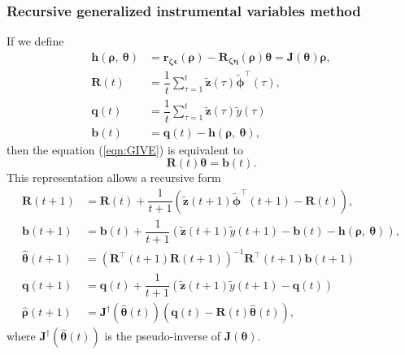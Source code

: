 \subsubsection{Recursive generalized instrumental variables method}
If we define
\begin{equation} \begin{aligned} \mathbf{h} \left( \bm{\rho}, \ \bm{\theta} \right)  &=  \mathbf{r}_{\bm{\zeta} \bm{\epsilon}} \left( \bm{\rho} \right) - \mathbf{R}_{\bm{\zeta} \bm{\eta}} \left( \bm{\rho} \right) \bm{\theta}  =  \mathbf{J} \left( \bm{\theta} \right) \bm{\rho}, \\
\mathbf{R} \left( t \right)  &=  \dfrac{1}{t} \sum_{\tau=1}^{t} \widetilde{\mathbf{z}} \left( \tau \right) \widetilde{\bm{\phi}}^\top \left( \tau \right) , \\
\mathbf{q} \left( t \right)  &=  \dfrac{1}{t} \sum_{\tau=1}^{t} \widetilde{\mathbf{z}} \left( \tau \right) \widetilde{y} \left( \tau \right) \\
\mathbf{b} \left( t \right)  &=  \mathbf{q} \left( t \right) - \mathbf{h} \left( \bm{\rho}, \ \bm{\theta} \right),
 \end{aligned} \end{equation}
then the equation (\ref{eqn:GIVE}) is equivalent to
\begin{equation} \mathbf{R} \left( t \right) \bm{\theta} = \mathbf{b} \left( t \right) . \end{equation}
This representation allows a recursive form
\begin{equation} \begin{aligned} 
\mathbf{R} \left( t+1 \right)  &= \mathbf{R} \left( t \right) + \dfrac{1}{t+1} \left( \widetilde{\mathbf{z}} \left( t+1 \right) \widetilde{\bm{\phi}}^\top \left( t+1 \right) - \mathbf{R} \left( t \right) \right), \\
\mathbf{b} \left( t+1 \right)  &= \mathbf{b} \left( t \right) + \dfrac{1}{t+1} \left( \widetilde{\mathbf{z}} \left( t+1 \right) \widetilde{y} \left( t+1 \right) - \mathbf{b} \left( t \right) - \mathbf{h} \left( \bm{\rho}, \ \bm{\theta} \right) \right), \\
\widehat{\bm{\theta}} \left( t+1 \right)  &=  \left( \mathbf{R}^\top \left( t+1 \right) \mathbf{R} \left( t+1 \right) \right)^{-1} \mathbf{R}^\top \left( t+1 \right) \mathbf{b} \left( t+1 \right) \\
\mathbf{q} \left( t+1 \right)  &= \mathbf{q} \left( t \right) + \dfrac{1}{t+1} \left( \widetilde{\mathbf{z}} \left( t+1 \right) \widetilde{y} \left( t+1 \right) - \mathbf{q} \left( t \right) \right) \\
\widehat{\bm{\rho}} \left( t+1 \right)  &=  \mathbf{J}^\dagger \left( \widehat{\bm{\theta}} \left( t \right) \right) \left( \mathbf{q} \left( t \right) - \mathbf{R} \left( t \right) \widehat{\bm{\theta}} \left( t \right) \right) ,
 \end{aligned} \end{equation}
where $\mathbf{J}^\dagger \left( \widehat{\bm{\theta}} \left( t \right) \right)$ is the pseudo-inverse of $\mathbf{J} \left( \bm{\theta} \right)$.

